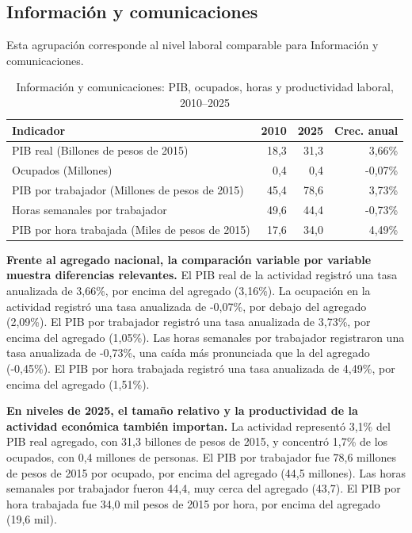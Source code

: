 \subsection{Información y comunicaciones}

Esta agrupación corresponde al nivel laboral comparable para Información y comunicaciones.

\begin{table}[H]
\centering
\caption{Información y comunicaciones: PIB, ocupados, horas y productividad laboral, 2010--2025}
\label{tab:agg25_j_productividad}
\small
\begin{tabular}{lrrr}
\toprule
Indicador & 2010 & 2025 & Crec. anual \\
\midrule
PIB real  (Billones de pesos de 2015) & 18,3 & 31,3 & 3,66\% \\
Ocupados (Millones) & 0,4 & 0,4 & -0,07\% \\
PIB por trabajador (Millones de pesos de 2015) & 45,4 & 78,6 & 3,73\% \\
Horas semanales por trabajador & 49,6 & 44,4 & -0,73\% \\
PIB por hora trabajada (Miles de pesos de 2015) & 17,6 & 34,0 & 4,49\% \\
\bottomrule
\end{tabular}
\end{table}

\textbf{Frente al agregado nacional, la comparación variable por variable muestra diferencias relevantes.} El PIB real de la actividad registró una tasa anualizada de 3,66\%, por encima del agregado (3,16\%). La ocupación en la actividad registró una tasa anualizada de -0,07\%, por debajo del agregado (2,09\%). El PIB por trabajador registró una tasa anualizada de 3,73\%, por encima del agregado (1,05\%). Las horas semanales por trabajador registraron una tasa anualizada de -0,73\%, una caída más pronunciada que la del agregado (-0,45\%). El PIB por hora trabajada registró una tasa anualizada de 4,49\%, por encima del agregado (1,51\%).

\textbf{En niveles de 2025, el tamaño relativo y la productividad de la actividad económica también importan.} La actividad representó 3,1\% del PIB real agregado, con 31,3 billones de pesos de 2015, y concentró 1,7\% de los ocupados, con 0,4 millones de personas. El PIB por trabajador fue 78,6 millones de pesos de 2015 por ocupado, por encima del agregado (44,5 millones). Las horas semanales por trabajador fueron 44,4, muy cerca del agregado (43,7). El PIB por hora trabajada fue 34,0 mil pesos de 2015 por hora, por encima del agregado (19,6 mil).

